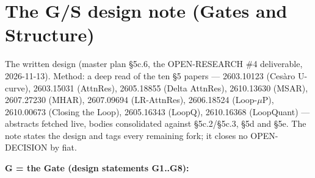 \chapter{The G/S design note (Gates and Structure)}

The written design (master plan \S5c.6, the OPEN-RESEARCH \#4 deliverable, 2026-11-13). Method:
a deep read of the ten \S5 papers --- 2603.10123 (Ces\`aro U-curve), 2603.15031 (AttnRes),
2605.18855 (Delta AttnRes), 2610.13630 (MSAR), 2607.27230 (MHAR), 2607.09694 (LR-AttnRes),
2606.18524 (Loop-$\mu$P), 2610.00673 (Closing the Loop), 2605.16343 (LoopQ), 2610.16368
(LoopQuant) --- abstracts fetched live, bodies consolidated against \S5c.2/\S5c.3, \S5d and
\S5e. The note states the design and tags every remaining fork; it closes no OPEN-DECISION by
fiat.

\textbf{G = the Gate (design statements G1..G8):}

